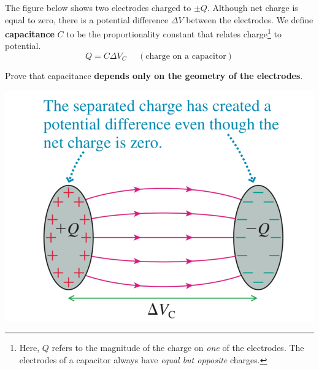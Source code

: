 \documentclass[12pt]{article}
\begin{document}
The figure below shows two electrodes charged to $\pm Q$. Although net charge is equal to zero, there is a potential difference $\Delta V$ between the electrodes. We define \textbf{capacitance} $C$ to be the proportionality constant that relates charge\footnote{Here, $Q$ refers to the magnitude of the charge on \emph{one} of the electrodes. The electrodes of a capacitor always have \emph{equal but opposite} charges.  } to potential.
$$ Q = C \Delta V_C  \ \ \ \ \ \  (\text{charge on a capacitor}) $$

\noindent
Prove that capacitance \textbf{depends only on the geometry of the electrodes}.
\begin{center}
	\includegraphics[width=.3\linewidth]{W4_f1}
\end{center}
\end{document}
